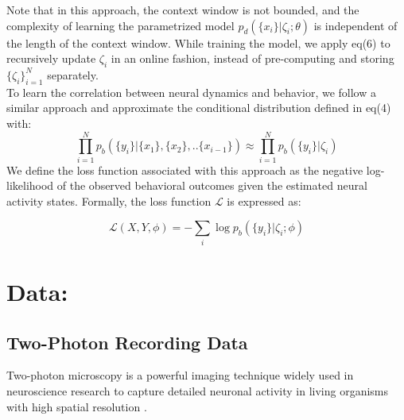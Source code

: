 \documentclass[12pt]{article}
\begin{document}
Note that in this approach, the context window is not bounded, and the complexity of learning the parametrized model $p_d(\{x_{i}\}|\zeta_i;\theta)$ is independent of the length of the context window. While training the model, we apply eq(6) to recursively update $\zeta_i$ in an online fashion, instead of pre-computing and storing $\{\zeta_i\}_{i=1}^N$ separately.
 \\

 To learn the correlation between neural dynamics and behavior, we follow a similar approach and approximate the conditional distribution defined in eq(4) with:
\\
 \begin{equation}
   \prod_{i=1}^{N} p_b(\{y_{i}\}| \{x_1\},\{x_2\},..\{x_{i-1}\}) 
   \approx  \prod_{i=1}^{N} p_b(\{y_{i}\}|\zeta_i)
\end{equation}
We define the loss function associated with this approach as the negative log-likelihood of the observed behavioral outcomes given the estimated neural activity states. Formally, the loss function \( \mathcal{L} \) is expressed as:

\[
\mathcal{L}(X,Y,\phi) = -\sum_{i} \log p_b(\{y_i\}|\zeta_i;\phi)
\]



\section{Data:}
\subsection{ Two-Photon Recording Data}
Two-photon microscopy is a powerful imaging technique widely used in neuroscience research to capture detailed neuronal activity in living organisms with high spatial resolution \cite{svoboda2006principles}.\\
\end{document}
